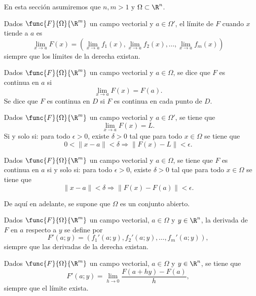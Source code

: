 \documentclass[a4,11pt]{aleph-notas}
\begin{document}
En esta sección asumiremos que $n,m>1$ y $\Omega\subset \R^n$.

\begin{defi}[Límite]
Dados $\func{F}{\Omega}{\R^m}$ un campo vectorial y $a\in \Omega'$, el límite de $F$ cuando $x$ tiende a $a$ es
\[
    \lim_{x\to a}F(x)
    =\left(\lim_{x\to a}f_1(x),\lim_{x\to a}f_2(x),\ldots,\lim_{x\to a}f_m(x)\right)
\]
siempre que los límites de la derecha existan.
\end{defi}

\begin{defi}[Continuidad]
Dados $\func{F}{\Omega}{\R^m}$ un campo vectorial y $a\in \Omega$, se dice que $F$ es continua en $a$ si
\[
    \lim_{x\to a}F(x)=F(a).
\]
Se dice que $F$ es continua en $D$ si $F$ es continua en cada punto de $D$.
\end{defi}

\begin{prop}
Dados $\func{F}{\Omega}{\R^m}$ un campo vectorial y $a\in \Omega'$, se tiene que
\[
    \lim_{x\to a}F(x)=L.
\]
Si y solo si: para todo $\epsilon>0$, existe $\delta>0$ tal que para todo $x\in \Omega$ se tiene que
\[
    0<\|x-a\|<\delta \Longrightarrow \|F(x)-L\|<\epsilon.
\]
\end{prop}

\begin{prop}
Dados $\func{F}{\Omega}{\R^m}$ un campo vectorial y $a\in \Omega$, se tiene que $F$ es continua en $a$ si y solo si: para todo $\epsilon>0$, existe $\delta>0$ tal que para todo $x\in \Omega$ se tiene que
\[
    \|x-a\|<\delta \Longrightarrow \|F(x)-F(a)\|<\epsilon.
\]
\end{prop}

De aquí en adelante, se supone que $\Omega$ es un conjunto abierto.

\begin{defi}
    Dados $\func{F}{\Omega}{\R^m}$ un campo vectorial, $a\in \Omega$ y $y\in \R^n$, la derivada de $F$ en $a$ respecto a $y$ se define por
    \[
        F'(a;y)=\left(f_1'(a;y),f_2'(a;y),\ldots,f_m'(a;y)\right),
    \]
    siempre que las derivadas de la derecha existan.
\end{defi}

\begin{prop}
    Dados $\func{F}{\Omega}{\R^m}$ un campo vectorial, $a\in \Omega$ y $y\in \R^n$, se tiene que
    \[
        F'(a;y)=\lim_{h\to 0}\frac{F(a+hy)-F(a)}{h},
    \]
    siempre que el límite exista.
\end{prop}
\end{document}
